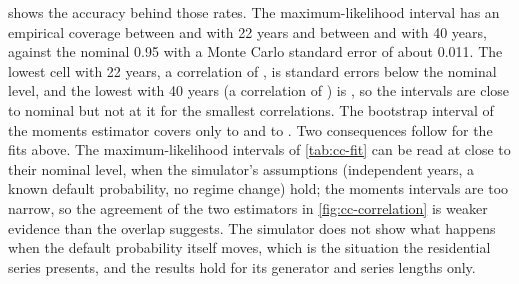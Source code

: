 

 shows the accuracy behind those rates. The maximum-likelihood interval has an empirical coverage between \ccCovMlMinShort{} and
\ccCovMlMaxShort{} with 22 years and between \ccCovMlMinLong{} and \ccCovMlMaxLong{} with 40 years, against the nominal 0.95 with a Monte Carlo standard
error of about 0.011. The lowest cell with 22 years, a correlation of \ccCovMlMinRhoShort{}, is \ccCovMlMinSeShort{} standard errors below the nominal level, and the lowest with 40 years (a correlation of \ccCovMlMinRhoLong{}) is \ccCovMlMinSeLong{}, so the intervals are close to nominal but not at it for the smallest correlations. The bootstrap interval of the moments estimator covers only \ccCovMoMinShort{} to \ccCovMoMaxShort{} and \ccCovMoMinLong{} to
\ccCovMoMaxLong{}. Two consequences follow for the fits above. The maximum-likelihood intervals of \cref{tab:cc-fit} can be read at close to their nominal
level, when the simulator's assumptions (independent years, a known default probability, no regime change) hold; the moments intervals are too narrow, so
the agreement of the two estimators in \cref{fig:cc-correlation} is weaker evidence than the overlap suggests. The simulator does not show what happens when
the default probability itself moves, which is the situation the residential series presents, and the results hold for its generator and series lengths only.
\emergencystretch=0pt
